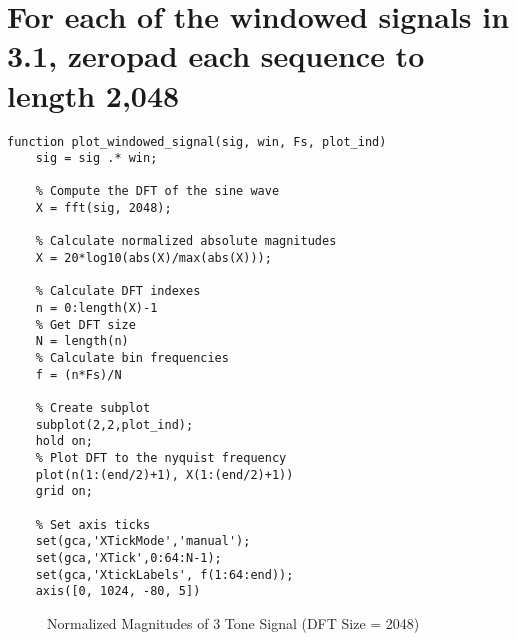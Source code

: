\documentclass[titlepage]{scrartcl}
\begin{document}
\section{For each of the windowed signals in 3.1, zeropad each sequence to
length 2,048}
\begin{lstlisting}
function plot_windowed_signal(sig, win, Fs, plot_ind)
    sig = sig .* win;
    
    % Compute the DFT of the sine wave
    X = fft(sig, 2048);

    % Calculate normalized absolute magnitudes
    X = 20*log10(abs(X)/max(abs(X)));

    % Calculate DFT indexes
    n = 0:length(X)-1
    % Get DFT size
    N = length(n)
    % Calculate bin frequencies
    f = (n*Fs)/N

    % Create subplot
    subplot(2,2,plot_ind);
    hold on;
    % Plot DFT to the nyquist frequency
    plot(n(1:(end/2)+1), X(1:(end/2)+1))
    grid on;

    % Set axis ticks
    set(gca,'XTickMode','manual');
    set(gca,'XTick',0:64:N-1);
    set(gca,'XtickLabels', f(1:64:end));
    axis([0, 1024, -80, 5])
\end{lstlisting}

\begin{figure}[H]
    \caption{Normalized Magnitudes of 3 Tone Signal (DFT Size = 2048)}
    \label{WindowedSigDFT2048}
\end{figure}
\end{document}

